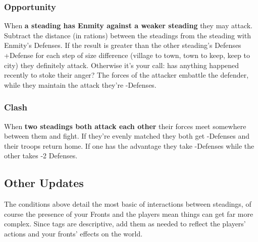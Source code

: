  
\subsubsection{Opportunity}   
 

When {\bf a steading has Enmity against a weaker steading}  they may attack. Subtract the distance (in rations) between the steadings from the steading with Enmity's Defenses. If the result is greater than the other steading's Defenses +Defense for each step of size difference (village to town, town to keep, keep to city) they definitely attack. Otherwise it's your call: has anything happened recently to stoke their anger? The forces of the attacker embattle the defender, while they maintain the attack they're -Defenses.

 
\subsubsection{Clash}   
 

When {\bf two steadings both attack each other}  their forces meet somewhere between them and fight. If they're evenly matched they both get -Defenses and their troops return home. If one has the advantage they take -Defenses while the other takes -2 Defenses.

 
\subsection{Other Updates}   
 

The conditions above detail the most basic of interactions between steadings, of course the presence of your Fronts and the players mean things can get far more complex. Since tags are descriptive, add them as needed to reflect the players' actions and your fronts' effects on the world.

 
